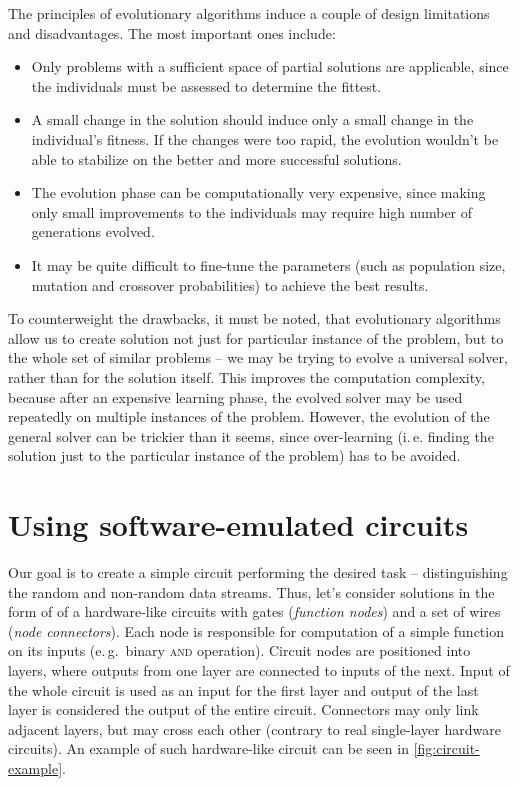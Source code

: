 \documentclass[12pt,oneside]{fithesis2}
\newcommand{\squarebullet}{\textcolor{black}{\raisebox{0.15em}{\rule{4pt}{4pt}}}}
\newenvironment{myItemize}{
  \begin{itemize}[leftmargin=2em,rightmargin=1em,itemsep=\parskip ,parsep=0em,topsep=0em,partopsep=0em]
  \renewcommand{\labelitemi}{\squarebullet}
  \renewcommand{\labelitemii}{$\diamond$}
}{
  \end{itemize}
}
\begin{document}
\noindent
The principles of evolutionary algorithms induce a couple of design limitations and disadvantages. 
The most important ones include:
\begin{myItemize}
\item Only problems with a sufficient space of partial solutions are applicable, since the individuals must be assessed 
to determine the fittest.
\item A small change in the solution should induce only a small change in the individual's fitness. If the changes were
too rapid, the evolution wouldn't be able to stabilize on the better and more successful solutions.
\item The evolution phase can be computationally very expensive, since making only small improvements to the individuals may require
high number of generations evolved.
\item It may be quite difficult to fine-tune the parameters (such as population size, mutation and crossover probabilities)
to achieve the best results.
\end{myItemize}

\noindent
To counterweight the drawbacks, it must be noted, that evolutionary algorithms allow us to create solution not just for particular
instance of the problem, but to the whole set of similar problems -- we may be trying to evolve a universal solver, 
rather than for the solution itself. 
This improves the computation complexity, because after an expensive learning phase, the evolved solver may be used
repeatedly on multiple instances of the problem. However, the evolution of the general solver can be trickier than it seems,
since over-learning (i.\,e. finding the solution just to the particular instance of the problem) has to be avoided.

\section{Using software-emulated circuits}
\label{sec:sw-circuits}

Our goal is to create a simple circuit performing the desired task -- distinguishing the random and non-random data streams.
Thus, let's consider solutions in the form of of a hardware-like circuits with gates (\textit{function nodes}) 
and a set of wires (\textit{node connectors}).
Each node is responsible for computation of a simple function on its inputs (e.\,g.\ binary \textsc{and} operation).
Circuit nodes are positioned into layers, where outputs from one layer are connected to inputs of the next. Input of the whole
circuit is used as an input for the first layer and output of the last layer is considered the output of the entire circuit.
Connectors may only link adjacent layers, but may cross each other (contrary to real single-layer hardware circuits).
An example of such hardware-like circuit can be seen in \autoref{fig:circuit-example}.
\end{document}
